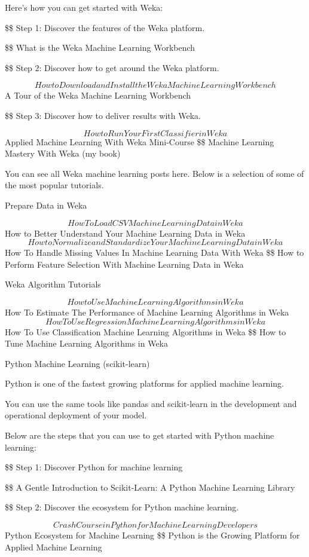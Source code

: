 \documentclass[11pt]{article}
\begin{document}
Here’s how you can get started with Weka:

\$\$ Step 1: Discover the features of the Weka platform. 

\$\$ What is the Weka Machine Learning Workbench

\$\$ Step 2: Discover how to get around the Weka platform. 

$$ How to Download and Install the Weka Machine Learning Workbench
 $$ A Tour of the Weka Machine Learning Workbench

\$\$ Step 3: Discover how to deliver results with Weka. 

$$ How to Run Your First Classifier in Weka
 $$ Applied Machine Learning With Weka Mini-Course
\$\$ Machine Learning Mastery With Weka (my book)

You can see all Weka machine learning posts here. Below is a selection of some of the most popular tutorials.

Prepare Data in Weka

$$ How To Load CSV Machine Learning Data in Weka
$$ How to Better Understand Your Machine Learning Data in Weka
$$ How to Normalize and Standardize Your Machine Learning Data in Weka
$$ How To Handle Missing Values In Machine Learning Data With Weka
\$\$ How to Perform Feature Selection With Machine Learning Data in Weka

Weka Algorithm Tutorials

$$ How to Use Machine Learning Algorithms in Weka
$$ How To Estimate The Performance of Machine Learning Algorithms in Weka
$$ How To Use Regression Machine Learning Algorithms in Weka
$$ How To Use Classification Machine Learning Algorithms in Weka
\$\$ How to Tune Machine Learning Algorithms in Weka

Python Machine Learning (scikit-learn)

Python is one of the fastest growing platforms for applied machine learning.

You can use the same tools like pandas and scikit-learn in the development and operational deployment of your model.

Below are the steps that you can use to get started with Python machine learning:

\$\$ Step 1: Discover Python for machine learning 

\$\$ A Gentle Introduction to Scikit-Learn: A Python Machine Learning Library

\$\$ Step 2: Discover the ecosystem for Python machine learning. 

$$ Crash Course in Python for Machine Learning Developers
 $$ Python Ecosystem for Machine Learning
\$\$ Python is the Growing Platform for Applied Machine Learning
\end{document}
